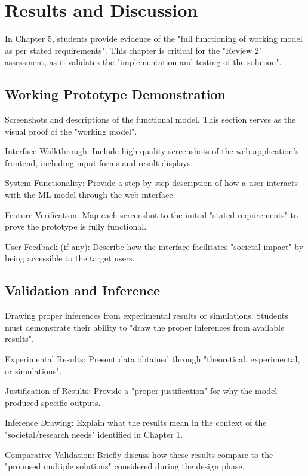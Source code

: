 

\chapter{Results and Discussion}

In Chapter 5, students provide evidence of the "full functioning of working model as per stated requirements". This chapter is critical for the "Review 2" assessment, as it validates the "implementation and testing of the solution". 

\section{Working Prototype Demonstration}
Screenshots and descriptions of the functional model. This section serves as the visual proof of the "working model".

Interface Walkthrough: Include high-quality screenshots of the web application’s frontend, including input forms and result displays.

System Functionality: Provide a step-by-step description of how a user interacts with the ML model through the web interface.

Feature Verification: Map each screenshot to the initial "stated requirements" to prove the prototype is fully functional.

User Feedback (if any): Describe how the interface facilitates "societal impact" by being accessible to the target users.

\section{Validation and Inference}
Drawing proper inferences from experimental results or simulations. Students must demonstrate their ability to "draw the proper inferences from available results".

Experimental Results: Present data obtained through "theoretical, experimental, or simulations".

Justification of Results: Provide a "proper justification" for why the model produced specific outputs.

Inference Drawing: Explain what the results mean in the context of the "societal/research needs" identified in Chapter 1.

Comparative Validation: Briefly discuss how these results compare to the "proposed multiple solutions" considered during the design phase.


